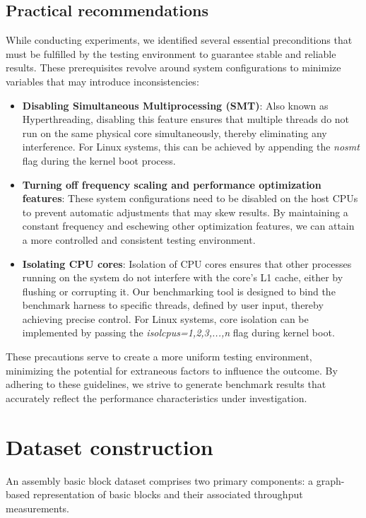 \subsection{Practical recommendations}

While conducting experiments, we identified several essential preconditions that must be fulfilled by 
the testing environment to guarantee stable and reliable results. These prerequisites revolve around 
system configurations to minimize variables that may introduce inconsistencies:

\begin{itemize}
	\item \textbf{Disabling Simultaneous Multiprocessing (SMT)}: Also known as Hyperthreading, disabling this feature ensures that multiple threads do not run on the same physical core simultaneously, thereby eliminating any interference. For Linux systems, this can be achieved by appending the \textit{nosmt} flag during the kernel boot process.
	\item \textbf{Turning off frequency scaling and performance optimization features}: These system configurations need to be disabled on the host CPUs to prevent automatic adjustments that may skew results. By maintaining a constant frequency and eschewing other optimization features, we can attain a more controlled and consistent testing environment.
	\item \textbf{Isolating CPU cores}: Isolation of CPU cores ensures that other processes running on the system do not interfere with the core's L1 cache, either by flushing or corrupting it. Our benchmarking tool is designed to bind the benchmark harness to specific threads, defined by user input, thereby achieving precise control. For Linux systems, core isolation can be implemented by passing the \textit{isolcpus=1,2,3,...,n} flag during kernel boot.
\end{itemize}

These precautions serve to create a more uniform testing environment, minimizing the potential for 
extraneous factors to influence the outcome. By adhering to these guidelines, we strive to generate 
benchmark results that accurately reflect the performance characteristics under investigation.

\section{Dataset construction}

An assembly basic block dataset comprises two primary components: a graph-based representation of 
basic blocks and their associated throughput measurements.

